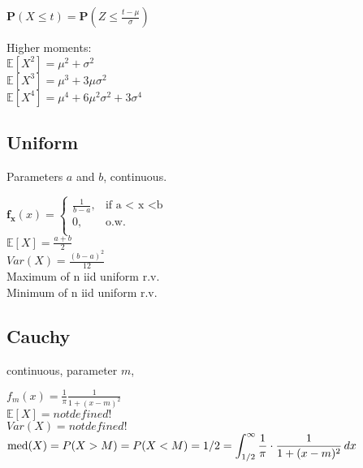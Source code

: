 $\mathbf{P}\left(X\leq t\right) = \displaystyle \mathbf{P}\left(Z\leq \frac{t-\mu}{\sigma}\right)$

Higher moments:\\

$\mathbb{E}[X^2] = \mu^2 + \sigma^2$\\
$\mathbb{E}[X^3] = \mu^3 + 3\mu\sigma^2$\\
$\mathbb{E}[X^4] = \mu^4 + 6\mu^2\sigma^2 +3\sigma^4$\\



\subsection*{Uniform}

Parameters $a$ and $b$, continuous.

$ \mathbf{f_x}(x)=
	\begin{cases}
		 \frac{1}{b-a},&\text{if a < x <b}\\
		0,&\text{o.w.}\\
	\end{cases}
$\\

$\mathbb{E}[X]=\frac{a+b}{2}$\\
$Var(X)=\frac{(b-a)^2}{12}$\\

Maximum of n iid uniform r.v.\\

Minimum of n iid uniform r.v.\\

\subsection*{Cauchy}
continuous, parameter $m$,

$f_ m(x) = \frac{1}{\pi } \frac{1}{1 + (x - m)^2}$\\

$\mathbb{E}[X]=not defined!$\\
$Var(X)=not defined!$\\

$\text {med}(X) = P(X > M) = P(X < M)\\ = 1/2 = \displaystyle \int _{1/2}^{\infty } \frac{1}{\pi } \cdot \frac{1}{1 + (x-m)^2} \,  dx$